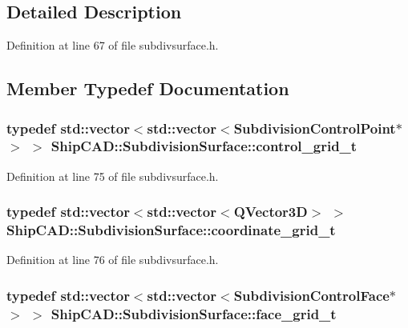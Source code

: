 \subsection{Detailed Description}


Definition at line 67 of file subdivsurface.\-h.



\subsection{Member Typedef Documentation}
\hypertarget{classShipCAD_1_1SubdivisionSurface_ae53cacefe98ce33992a05f941f4ff4ee}{
\subsubsection[{control\-\_\-grid\-\_\-t}]{\setlength{\rightskip}{0pt plus 5cm}typedef std\-::vector$<$std\-::vector$<${\bf Subdivision\-Control\-Point}$\ast$$>$ $>$ {\bf Ship\-C\-A\-D\-::\-Subdivision\-Surface\-::control\-\_\-grid\-\_\-t}}}\label{classShipCAD_1_1SubdivisionSurface_ae53cacefe98ce33992a05f941f4ff4ee}


Definition at line 75 of file subdivsurface.\-h.

\hypertarget{classShipCAD_1_1SubdivisionSurface_a8ed657cb7d4cd34662bd2d3e949d3e3b}{
\subsubsection[{coordinate\-\_\-grid\-\_\-t}]{\setlength{\rightskip}{0pt plus 5cm}typedef std\-::vector$<$std\-::vector$<$Q\-Vector3\-D$>$ $>$ {\bf Ship\-C\-A\-D\-::\-Subdivision\-Surface\-::coordinate\-\_\-grid\-\_\-t}}}\label{classShipCAD_1_1SubdivisionSurface_a8ed657cb7d4cd34662bd2d3e949d3e3b}


Definition at line 76 of file subdivsurface.\-h.

\hypertarget{classShipCAD_1_1SubdivisionSurface_a26a7d7b71acd662b1014ab39af4ee343}{
\subsubsection[{face\-\_\-grid\-\_\-t}]{\setlength{\rightskip}{0pt plus 5cm}typedef std\-::vector$<$std\-::vector$<${\bf Subdivision\-Control\-Face}$\ast$$>$ $>$ {\bf Ship\-C\-A\-D\-::\-Subdivision\-Surface\-::face\-\_\-grid\-\_\-t}}}\label{classShipCAD_1_1SubdivisionSurface_a26a7d7b71acd662b1014ab39af4ee343}


